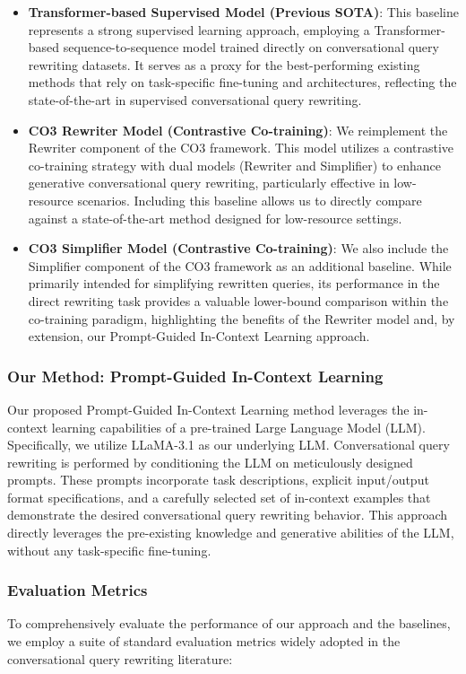 \begin{itemize}
    \item \textbf{Transformer-based Supervised Model (Previous SOTA)}:  This baseline represents a strong supervised learning approach, employing a Transformer-based sequence-to-sequence model trained directly on conversational query rewriting datasets. It serves as a proxy for the best-performing existing methods that rely on task-specific fine-tuning and architectures, reflecting the state-of-the-art in supervised conversational query rewriting.
    \item \textbf{CO3 Rewriter Model (Contrastive Co-training)}: We reimplement the Rewriter component of the CO3 framework. This model utilizes a contrastive co-training strategy with dual models (Rewriter and Simplifier) to enhance generative conversational query rewriting, particularly effective in low-resource scenarios.  Including this baseline allows us to directly compare against a state-of-the-art method designed for low-resource settings.
    \item \textbf{CO3 Simplifier Model (Contrastive Co-training)}:  We also include the Simplifier component of the CO3 framework as an additional baseline.  While primarily intended for simplifying rewritten queries, its performance in the direct rewriting task provides a valuable lower-bound comparison within the co-training paradigm, highlighting the benefits of the Rewriter model and, by extension, our Prompt-Guided In-Context Learning approach.
\end{itemize}

\subsubsection{Our Method: Prompt-Guided In-Context Learning}
Our proposed Prompt-Guided In-Context Learning method leverages the in-context learning capabilities of a pre-trained Large Language Model (LLM).  Specifically, we utilize LLaMA-3.1 as our underlying LLM.  Conversational query rewriting is performed by conditioning the LLM on meticulously designed prompts. These prompts incorporate task descriptions, explicit input/output format specifications, and a carefully selected set of in-context examples that demonstrate the desired conversational query rewriting behavior.  This approach directly leverages the pre-existing knowledge and generative abilities of the LLM, without any task-specific fine-tuning.

\subsubsection{Evaluation Metrics}
To comprehensively evaluate the performance of our approach and the baselines, we employ a suite of standard evaluation metrics widely adopted in the conversational query rewriting literature:

